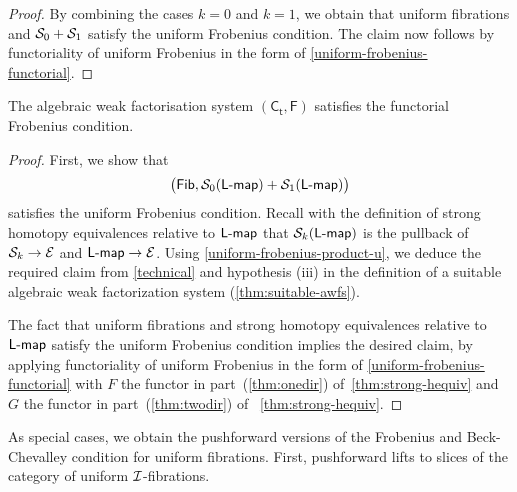 \documentclass[reqno,10pt,a4paper,oneside,draft]{amsart}
\newcommand{\LL}{\mathsf{L}}
\begin{document}
{{\begin{proof}
By combining the cases $k = 0$ and $k = 1$, we obtain that uniform fibrations and $\cal{S}_0 + \cal{S}_1$ satisfy the uniform Frobenius
condition. The claim now follows by functoriality of uniform Frobenius in the form of \cref{uniform-frobenius-functorial}.
\end{proof}





\begin{theorem} \label{uniform-fibrations-uniform-frobenius}
The algebraic weak factorisation system $(\mathsf{C_t}, \mathsf{F})$  satisfies the functorial Frobenius condition.
\end{theorem}


\begin{proof} First, we show that 
\[
 \big(  \Fib, \cal{S}_0(\pcoalg{\LL}) + \cal{S}_1(\pcoalg{\LL}) \big)
\]
 satisfies the uniform Frobenius condition. Recall with the definition of strong homotopy equivalences relative to $\pcoalg{\LL}$ that 
 $\cal{S}_k(\pcoalg{\LL})$ is the pullback of $\cal{S}_k  \to \cal{E}$ and $\pcoalg{\LL} \to \cal{E}$.
Using \cref{uniform-frobenius-product-u}, we deduce the required claim from \cref{technical} and hypothesis (iii) in the
definition of a suitable algebraic weak factorization system (\cref{thm:suitable-awfs}). 

The fact that uniform fibrations and strong homotopy equivalences relative to $\pcoalg{\LL}$ satisfy the uniform Frobenius condition 
implies the desired claim, by applying functoriality of uniform Frobenius in the form of \cref{uniform-frobenius-functorial} with $F$ the functor in part~(\ref{thm:onedir}) of~\cref{thm:strong-hequiv} and $G$ the functor in part~(\ref{thm:twodir}) of ~\cref{thm:strong-hequiv}. 
\end{proof}


As special cases, we obtain the pushforward versions of the Frobenius and Beck-Chevalley condition for uniform fibrations.
First, pushforward lifts to slices of the category of uniform $\cal{I}$-fibrations.

}}
\end{document}
